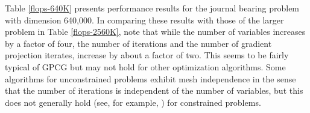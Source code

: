 
Table \ref{flops-640K} presents performance results for the journal
bearing problem with dimension 640,000.
In comparing these results with those of the larger problem in Table
\ref{flops-2560K}, note that while the number of variables increases
by a factor of four,
the number of iterations and the number of gradient projection iterates,
increase by about a factor of two.
This seems to be fairly typical of GPCG but may not hold for
other optimization algorithms.
Some algorithms for unconstrained problems exhibit mesh independence in the
sense that the number of iterations is independent of the number of
variables, but this does not generally hold 
(see, for example, \cite{ALD00}) for constrained problems.


